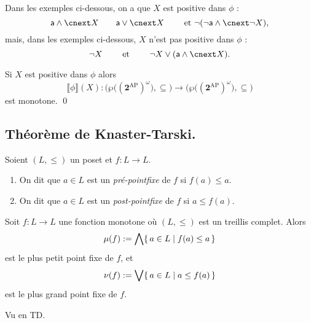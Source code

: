 \documentclass[./main]{subfiles}
\begin{document}
  \begin{exm}
    Dans les exemples ci-dessous, on a que $X$ est positive dans $\phi$ :
    \[
    \mathsf{a} \land \nxt X \quad\quad \mathsf{a} \lor \nxt X \quad\quad \text{ et } \lnot (\lnot \mathsf{a} \land \nxt \lnot X)
    ,\] 
    mais, dans les exemples ci-dessous, $X$ n'est pas positive dans $\phi$ :
    \[
    \lnot X \quad\quad \text{ et }\quad\quad \lnot X \lor (\mathsf{a} \land \nxt X)
    .\]
  \end{exm}

  \begin{lem}
    Si $X$ est positive dans $\phi$ alors 
    \[
    \llbracket \phi\rrbracket(X) : \big(\wp\big((\mathbf{2}^\mathrm{AP})^\omega\big), \subseteq\big) \longrightarrow \big(\wp\big((\mathbf{2}^\mathrm{AP})^\omega\big), \subseteq\big)
    \]
    est monotone.
    \qed
  \end{lem}

  \subsection{Théorème de Knaster-Tarski.}

  \begin{defn}
    Soient $(L, \le)$ un poset et $f : L \to L$.
    \begin{enumerate}
      \item On dit que $a \in L$ est un \textit{pré-pointfixe} de $f$ si $f(a) \le a$.
      \item On dit que $a \in L$ est un \textit{post-pointfixe} de $f$ si $a \le f(a)$.
    \end{enumerate}
  \end{defn}

  \begin{thm}
    Soit $f : L \to L$ une fonction monotone où $(L, \le)$ est un treillis complet.
    Alors 
    \[
    \mu(f) := \bigwedge \mleft\{\,a \in L \;\middle|\; f(a) \le a\,\mright\}
    \] 
    est le plus petit point fixe de $f$, et
    \[
    \nu(f) := \bigvee \mleft\{\,a \in L \;\middle|\; a \le f(a)\,\mright\}
    \] est le plus grand point fixe de $f$.
  \end{thm}
  \begin{prv}
    Vu en TD.
  \end{prv}
\end{document}
